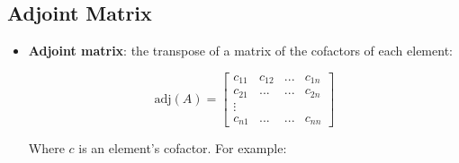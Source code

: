 \subsection{Adjoint Matrix}

\begin{itemize}
    \item \textbf{Adjoint matrix}: the transpose of a matrix of the cofactors of each element:
    
    \begin{equation*}
        \text{adj}(A) = 
        \begin{bmatrix}
            c_{11} & c_{12} & ...  & c_{1n} \\
            c_{21} & ... & ... & c_{2n} \\
            \vdots & & & \\
            c_{n1} & ... & ...  & c_{nn}     
        \end{bmatrix}
    \end{equation*}

    Where $c$ is an element's cofactor. For example:


\end{itemize}
